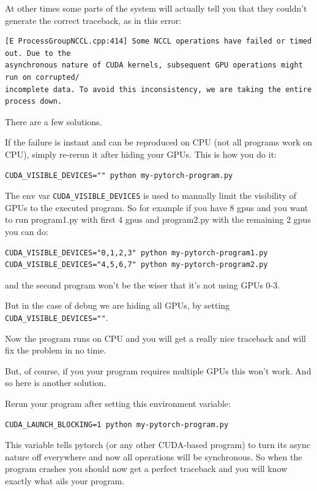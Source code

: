 \documentclass[
]{report}
\begin{document}
At other times some parts of the system will actually tell you that they
couldn't generate the correct traceback, as in this error:

\begin{verbatim}
[E ProcessGroupNCCL.cpp:414] Some NCCL operations have failed or timed out. Due to the
asynchronous nature of CUDA kernels, subsequent GPU operations might run on corrupted/
incomplete data. To avoid this inconsistency, we are taking the entire process down.
\end{verbatim}

There are a few solutions.

If the failure is instant and can be reproduced on CPU (not all programs
work on CPU), simply re-rerun it after hiding your GPUs. This is how you
do it:

\begin{verbatim}
CUDA_VISIBLE_DEVICES="" python my-pytorch-program.py
\end{verbatim}

The env var \texttt{CUDA\_VISIBLE\_DEVICES} is used to manually limit
the visibility of GPUs to the executed program. So for example if you
have 8 gpus and you want to run program1.py with first 4 gpus and
program2.py with the remaining 2 gpus you can do:

\begin{verbatim}
CUDA_VISIBLE_DEVICES="0,1,2,3" python my-pytorch-program1.py
CUDA_VISIBLE_DEVICES="4,5,6,7" python my-pytorch-program2.py
\end{verbatim}

and the second program won't be the wiser that it's not using GPUs 0-3.

But in the case of debug we are hiding all GPUs, by setting
\texttt{CUDA\_VISIBLE\_DEVICES=""}.

Now the program runs on CPU and you will get a really nice traceback and
will fix the problem in no time.

But, of course, if you your program requires multiple GPUs this won't
work. And so here is another solution.

Rerun your program after setting this environment variable:

\begin{verbatim}
CUDA_LAUNCH_BLOCKING=1 python my-pytorch-program.py
\end{verbatim}

This variable tells pytorch (or any other CUDA-based program) to turn
its async nature off everywhere and now all operations will be
synchronous. So when the program crashes you should now get a perfect
traceback and you will know exactly what ails your program.
\end{document}
